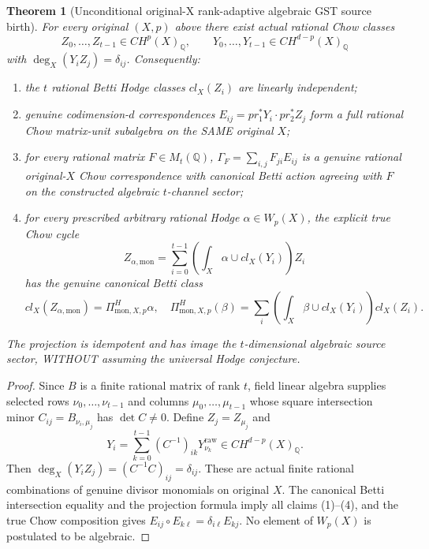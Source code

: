 \documentclass[11pt]{article}
\newtheorem{theorem}{Theorem}
\begin{document}
\begin{theorem}[Unconditional original-X rank-adaptive algebraic GST source birth]
For every original $(X,p)$ above there exist \emph{actual}
rational Chow classes
\[
Z_0,\ldots,Z_{t-1}\in CH^p(X)_{\mathbb Q},\qquad
Y_0,\ldots,Y_{t-1}\in CH^{d-p}(X)_{\mathbb Q}
\]
with $\deg_X(Y_iZ_j)=\delta_{ij}$.
Consequently:
\begin{enumerate}
\item the $t$ rational Betti Hodge classes $cl_X(Z_i)$ are linearly independent;
\item genuine codimension-$d$ correspondences
$E_{ij}=pr_1^*Y_i\cdot pr_2^*Z_j$
form a full rational Chow matrix-unit subalgebra on the SAME original $X$;
\item for every rational matrix $F\in M_t(\mathbb Q)$,
$\Gamma_F=\sum_{i,j}F_{ji}E_{ij}$ is a genuine rational original-$X$
Chow correspondence with canonical Betti action agreeing with $F$
on the constructed algebraic $t$-channel sector;
\item for every prescribed \emph{arbitrary} rational Hodge
$\alpha\in W_p(X)$, the explicit true Chow cycle
\[
\boxed{Z_{\alpha,\mathrm{mon}}
=\sum_{i=0}^{t-1}
\left(\int_X\alpha\cup cl_X(Y_i)\right)Z_i}
\]
has the genuine canonical Betti class
\[
cl_X(Z_{\alpha,\mathrm{mon}})
=\Pi_{\mathrm{mon},X,p}^H\alpha,
\quad
\Pi_{\mathrm{mon},X,p}^H(\beta)
=\sum_i\left(\int_X\beta\cup cl_X(Y_i)\right)cl_X(Z_i).
\]
\end{enumerate}
The projection is idempotent and has image the
$t$-dimensional algebraic source sector, WITHOUT
assuming the universal Hodge conjecture.
\end{theorem}

\begin{proof}
Since $B$ is a finite rational matrix of rank $t$, field
linear algebra supplies selected rows $\nu_0,\ldots,\nu_{t-1}$
and columns $\mu_0,\ldots,\mu_{t-1}$ whose square
intersection minor $C_{ij}=B_{\nu_i,\mu_j}$ has
$\det C\ne0$. Define $Z_j=Z_{\mu_j}$ and
\[
Y_i=\sum_{k=0}^{t-1}(C^{-1})_{ik}
Y_{\nu_k}^{\mathrm{raw}}\in CH^{d-p}(X)_{\mathbb Q}.
\]
Then $\deg_X(Y_iZ_j)=(C^{-1}C)_{ij}=\delta_{ij}$.
These are actual finite rational combinations of
genuine divisor monomials on original $X$.
The canonical Betti intersection equality and
the projection formula imply all claims (1)--(4),
and the true Chow composition gives
$E_{ij}\circ E_{k\ell}=\delta_{i\ell}E_{kj}$.
No element of $W_p(X)$ is postulated to be algebraic.
\end{proof}
\end{document}
